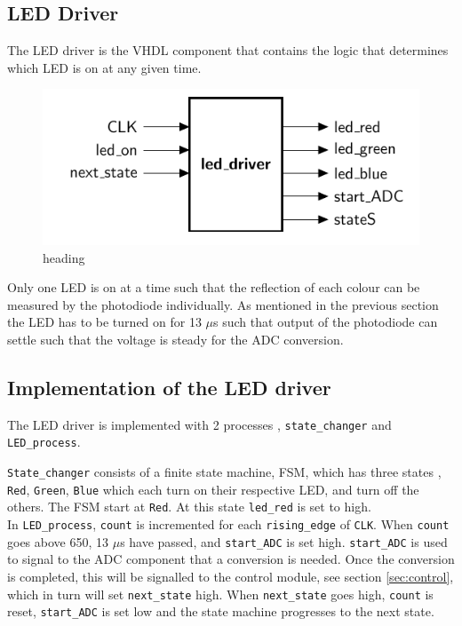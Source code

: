 \subsection{LED Driver}
The LED driver is the VHDL component that contains the logic that determines which LED is on at any given time.
\begin{figure}[h!]
	\centering
	\includegraphics[scale=1]{images/LED_ent}
	\caption{heading}
	\label{fig:pinoutled}
\end{figure}
Only one LED is on at a time such that the reflection of each colour can be measured by the photodiode individually.
As mentioned in the previous section the LED has to be turned on for 13 $\mu$s such that output of the photodiode can settle such that the voltage is steady for the ADC conversion.
\subsection{Implementation of the LED driver}

The LED driver is implemented with 2 processes , \texttt{state\_changer} and \texttt{LED\_process}. 

\texttt{State\_changer} consists of a finite state machine, FSM, which has three states , \texttt{Red}, \texttt{Green}, \texttt{Blue} which each turn on their respective LED, and turn off the others.  The FSM start at \texttt{Red}.  At this state \texttt{led\_red} is set to high.\\

In \texttt{LED\_process}, \texttt{count} is incremented for each \texttt{rising\_edge} of \texttt{CLK}.  When \texttt{count} goes above 650, 13 $\mu$s have passed, and  \texttt{start\_ADC} is set high. 
\texttt{start\_ADC} is used to signal to the ADC component that a conversion is needed.
Once the conversion is completed, this will be signalled to the control module, see section \ref{sec:control}, which in turn will set \texttt{next\_state} high.
When \texttt{next\_state} goes high, \texttt{count} is reset, \texttt{start\_ADC} is set low  and the state machine progresses to the next state.
